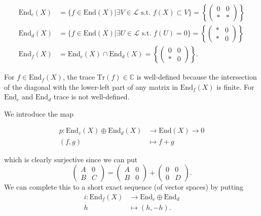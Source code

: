 \medskip\noindent
\begin{align*}
\text{End}_c(X)&=\{f \in \text{End}(X)|
\exists  V \in \mathcal{L}
\text{ s.t. }f(X) \subset V\}
=\left\{\begin{pmatrix}
0&0\\
*&*
\end{pmatrix}\right\}\\
\text{End}_d(X)&=\{f \in
\text{End}(X)|\exists U \in \mathcal{L}
\text{ s.t. }f(U)=0\}
=\left\{\begin{pmatrix}
*&0\\
*&0
\end{pmatrix}\right\}\\
\text{End}_f(X)&=\text{End}_c(X) \cap
\text{End}_d(X)
=\left\{\begin{pmatrix}
0&0\\
*&0
\end{pmatrix}\right\}.
\end{align*}

\begin{remark}
\label{remark-trace-in-End}
For $f \in \text{End}_f(X)$,
the trace $\text{Tr}(f) \in \mathbb{C}$
is well-defined because
the intersection of the diagonal
with the lower-left part of any
matrix in $\text{End}_f(X)$ is finite.
For $\text{End}_c$ and $\text{End}_d$
trace is not well-defined.
\end{remark}

\noindent
We introduce the map

$$
\begin{aligned}
p:\text{End}_c(X) \oplus \text{End}_d(X)
&\longrightarrow \text{End}(X)\to  0\\
(f,g) &\longmapsto f+g
\end{aligned}
$$

\noindent
which is clearly surjective since we can put
$$
\begin{pmatrix}
A&0\\
B&C
\end{pmatrix}=\begin{pmatrix}
A&0\\
B&0
\end{pmatrix}+
\begin{pmatrix}
0&0\\
0&D
\end{pmatrix}.
$$
We can complete this to a short exact
sequence
(of vector spaces)
by putting
$$
\begin{aligned}
i:\text{End}_f(X)  &\longrightarrow
\text{End}_c \oplus \text{End}_d \\
h &\longmapsto (h,-h).
\end{aligned}
$$

